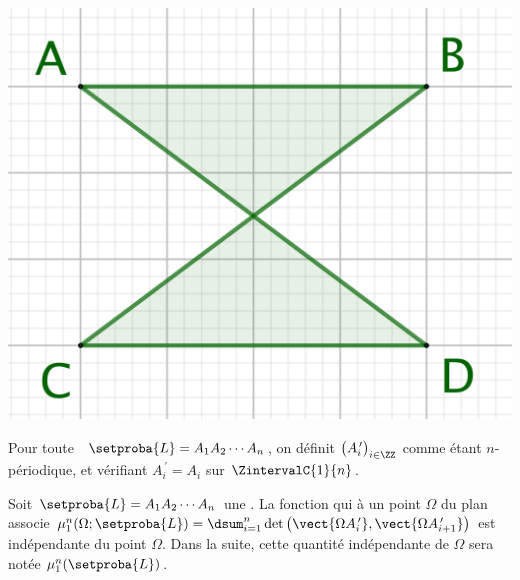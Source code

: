 \begin{center}
    \includegraphics[scale=.4]{content/polygon/sufficient-cond/anti-para.png}
\end{center}




\begin{defi} \label{garea-pt-ct}
    Pour toute \nline\  $\setproba{L} = A_1 A_2 \cdots A_n$, on définit $\big( A^{\,\prime}_i \big)_{i \in \ZZ}$ comme étant $n$-périodique, et vérifiant $A^{\,\prime}_{i} = A_i$ sur $\ZintervalC{1}{n}$.
\end{defi}




\begin{fact} \label{garea-pt-ct}
    Soit $\setproba{L} = A_1 A_2 \cdots A_n$ une \nline.
    La fonction qui à un point $\Omega$ du plan associe 
    $\mu_1^n (\Omega ;\setproba{L}) = \dsum_{i=1}^{n} \det \big( \vect{\Omega A^{\,\prime}_i} , \vect{\Omega A^{\,\prime}_{i+1}} \big)$ est indépendante du point $\Omega$.
    Dans la suite, cette quantité indépendante de $\Omega$ sera notée $\mu_1^n (\setproba{L})$.
\end{fact}



